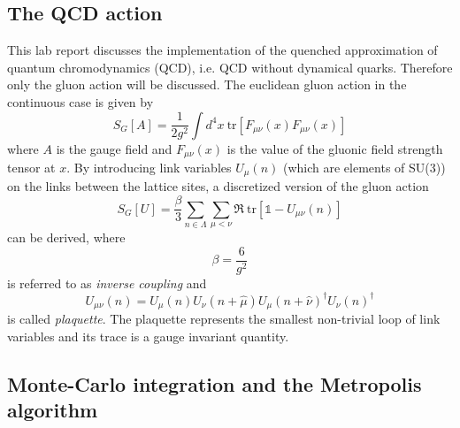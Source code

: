 \documentclass[graybox]{svmult}
\begin{document}
\subsection{The QCD action}

This lab report discusses the implementation of the quenched approximation of quantum chromodynamics (QCD), i.e. QCD without dynamical quarks. Therefore only the gluon action will be discussed.
The euclidean gluon action in the continuous case is given by
\begin{equation}
S_G[A] = \frac 1 {2g^2} \int d^4x \ \text{tr}[F_{\mu \nu}(x) F_{\mu \nu}(x)]
\end{equation}
where $A$ is the gauge field and $F_{\mu \nu}(x)$ is the value of the gluonic field strength tensor at $x$. By introducing link variables $U_{\mu}(n)$ (which are elements of SU(3)) on the links between the lattice sites, a discretized version of the gluon action
\begin{equation}
\label{eq:plaq}
S_G[U] = \frac {\beta} 3 \sum_{n \in \Lambda} \sum_{\mu < \nu} \Re\ \text{tr} [\mathbb{1} - U_{\mu \nu}(n)]
\end{equation}
can be derived, where
\begin{equation}
\beta = \frac 6 {g^2}
\end{equation}
is referred to as \emph{inverse coupling} and 
\begin{equation}
U_{\mu \nu}(n) = U_{\mu}(n) U_{\nu}(n+\hat{\mu}) U_{\mu}(n+\hat{\nu})^{\dagger} U_{\nu}(n)^{\dagger}
\end{equation}
is called \emph{plaquette}. The plaquette represents the smallest non-trivial loop of link variables and its trace is a gauge invariant quantity.



\subsection{Monte-Carlo integration and the Metropolis algorithm}
\end{document}
